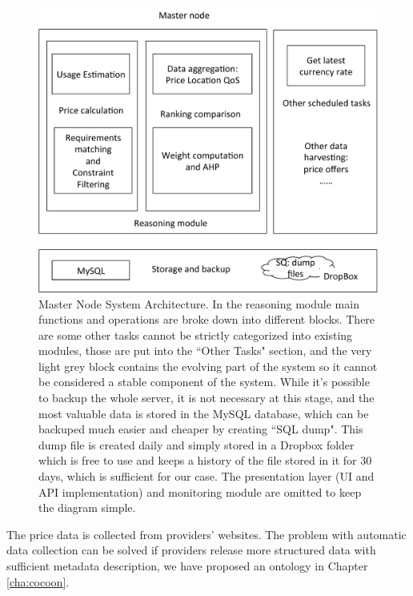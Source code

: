 \begin{figure}[!ht]
 \centering
 \includegraphics[width=\textwidth,keepaspectratio]{Figures/QoS/figure3.pdf}
 \caption{Master Node System Architecture. In the reasoning module main functions and operations are broke down into different blocks. There are some other tasks cannot be strictly categorized into existing modules, those are put into the ``Other Tasks" section, and the very light grey block contains the evolving part of the system so it cannot be considered a stable component of the system. While it’s possible to backup the whole server, it is not necessary at this stage, and the most valuable data is stored in the MySQL database, which can be backuped much easier and cheaper by creating ``SQL dump". This dump file is created daily and simply stored in a Dropbox folder which is free to use and keeps a history of the file stored in it for 30 days, which is sufficient for our case. The presentation layer (UI and API implementation) and monitoring module are omitted to keep the diagram simple.}
\label{fig3}
\end{figure}

The price data is collected from providers' websites. The problem with automatic data collection can be solved if providers release more structured data with sufficient metadata description, we have proposed an ontology in Chapter \ref{cha:cocoon}.

